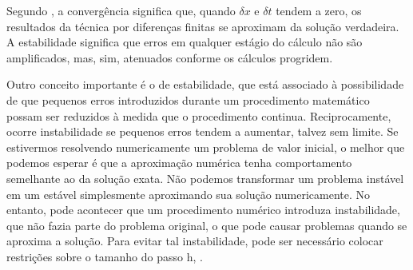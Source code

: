 Segundo \citep{chapra2008}, a convergência significa que, quando \(\delta x\) e \(\delta t\) tendem a zero, os resultados da técnica por diferenças finitas se aproximam da solução verdadeira. A estabilidade significa que erros em qualquer estágio do cálculo não são amplificados, mas, sim, atenuados conforme os cálculos progridem.

Outro conceito importante é o de estabilidade, que está associado à possibilidade de que pequenos erros introduzidos durante um procedimento matemático possam ser reduzidos à medida que o procedimento continua. Reciprocamente, ocorre instabilidade se pequenos erros tendem a aumentar, talvez sem limite. Se estivermos resolvendo numericamente um problema de valor inicial, o melhor que podemos esperar é que a aproximação numérica tenha comportamento semelhante ao da solução exata. Não podemos transformar um problema instável em um estável simplesmente aproximando sua solução numericamente. No entanto, pode acontecer que um procedimento numérico introduza instabilidade, que não fazia parte do problema original, o que pode causar problemas quando se aproxima a solução. Para evitar tal instabilidade, pode ser necessário colocar restrições sobre o tamanho do passo h, \citep{boyce2020}.
